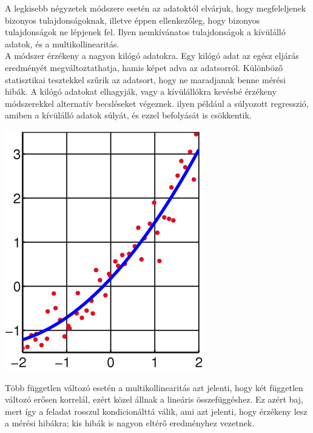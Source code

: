 \documentclass[11pt,a4paper]{article}
\begin{document}
  \begin{tcolorbox}[colback=MidnightBlue!5!white,colframe=MidnightBlue!60!black,title= Legkisebb negyzetek módszere]
    \begin{multicols*}{2}
        A legkisebb négyzetek módszere esetén az adatoktól elvárjuk, hogy megfeleljenek bizonyos tulajdonságoknak, illetve éppen ellenkezőleg, hogy bizonyos tulajdonságok ne lépjenek fel. Ilyen nemkívánatos tulajdonságok a kívülálló adatok, és a multikollinearitás.\\
        A módszer érzékeny a nagyon kilógó adatokra. Egy kilógó adat az egész eljárás eredményét megváltoztathatja, hamis képet adva az adatsorról. Különböző statisztikai tesztekkel szűrik az adatsort, hogy ne maradjanak benne mérési hibák. A kilógó adatokat elhagyják, vagy a kívülállókra kevésbé érzékeny módszerekkel alternatív becsléseket végeznek. ilyen például a súlyozott regresszió, amiben a kívülálló adatok súlyát, és ezzel befolyását is csökkentik.
        \columnbreak
        \begin{center}
            \includegraphics*[width=.4\textwidth]{negyzet.png}
        \end{center}
    \end{multicols*}
        Több független változó esetén a multikollinearitás azt jelenti, hogy két független változó erősen korrelál, ezért közel állnak a lineáris összefüggéshez. Ez azért baj, mert így a feladat rosszul kondicionálttá válik, ami azt jelenti, hogy érzékeny lesz a mérési hibákra; kis hibák is nagyon eltérő eredményhez vezetnek.
  \end{tcolorbox}
\end{document}
